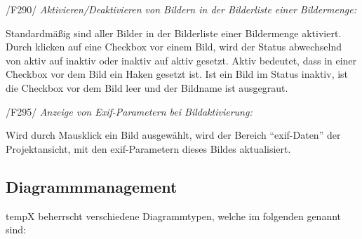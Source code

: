 \begin{description}
		\item{/F290/} \textit{Aktivieren/Deaktivieren von Bildern in der Bilderliste einer Bildermenge:}\par Standardmäßig sind aller Bilder in der Bilderliste einer Bildermenge aktiviert. Durch klicken auf eine Checkbox vor einem Bild, wird der Status abwechselnd von aktiv auf inaktiv oder inaktiv auf aktiv gesetzt. Aktiv bedeutet, dass in einer Checkbox vor dem Bild ein Haken gesetzt ist. Ist ein Bild im Status inaktiv, ist die Checkbox vor dem Bild leer und der Bildname ist ausgegraut.

		\item{/F295/} \textit{Anzeige von Exif-Parametern bei Bildaktivierung:}\par Wird durch Mausklick ein Bild ausgewählt, wird der Bereich "`\gls{exif}-Daten"' der Projektansicht, mit den \gls{exif}-Parametern dieses Bildes aktualisiert.
		
	\end{description}

\subsection{Diagrammmanagement}

\label{subsec:diagrammmgmt}

	\gls{tempX} beherrscht verschiedene Diagrammtypen, welche im folgenden genannt sind:
	
